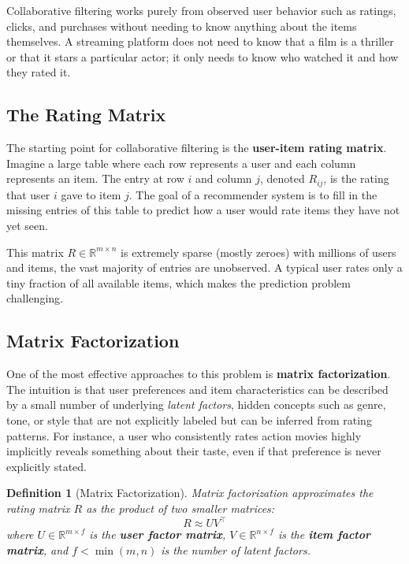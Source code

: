 \documentclass[12pt,a4paper]{report}
\newtheorem{definition}{Definition}[chapter]
\begin{document}
Collaborative filtering works purely from observed user behavior such as ratings, clicks, and purchases without needing to know anything about the items themselves. A streaming platform does not need to know that a film is a thriller or that it stars a particular actor; it only needs to know who watched it and how they rated it.

\subsection*{The Rating Matrix}

The starting point for collaborative filtering is the \textbf{user-item rating matrix}. Imagine a large table where each row represents a user and each column represents an item. The entry at row \( i \) and column \( j \), denoted \( R_{ij} \), is the rating that user \( i \) gave to item \( j \). The goal of a recommender system is to fill in the missing entries of this table to predict how a user would rate items they have not yet seen.

This matrix \( R \in \mathbb{R}^{m \times n} \) is extremely sparse (mostly zeroes) with millions of users and items, the vast majority of entries are unobserved. A typical user rates only a tiny fraction of all available items, which makes the prediction problem challenging.

\subsection*{Matrix Factorization}

One of the most effective approaches to this problem is \textbf{matrix factorization}. The intuition is that user preferences and item characteristics can be described by a small number of underlying \textit{latent factors}, hidden concepts such as genre, tone, or style that are not explicitly labeled but can be inferred from rating patterns. For instance, a user who consistently rates action movies highly implicitly reveals something about their taste, even if that preference is never explicitly stated.

\begin{definition}[Matrix Factorization]
Matrix factorization approximates the rating matrix \( R \) as the product of two smaller matrices:
\[
R \approx UV^\top
\]
where \( U \in \mathbb{R}^{m \times f} \) is the \textbf{user factor matrix}, \( V \in \mathbb{R}^{n \times f} \) is the \textbf{item factor matrix}, and \( f < \min(m, n) \) is the number of latent factors.
\end{definition}
\end{document}
